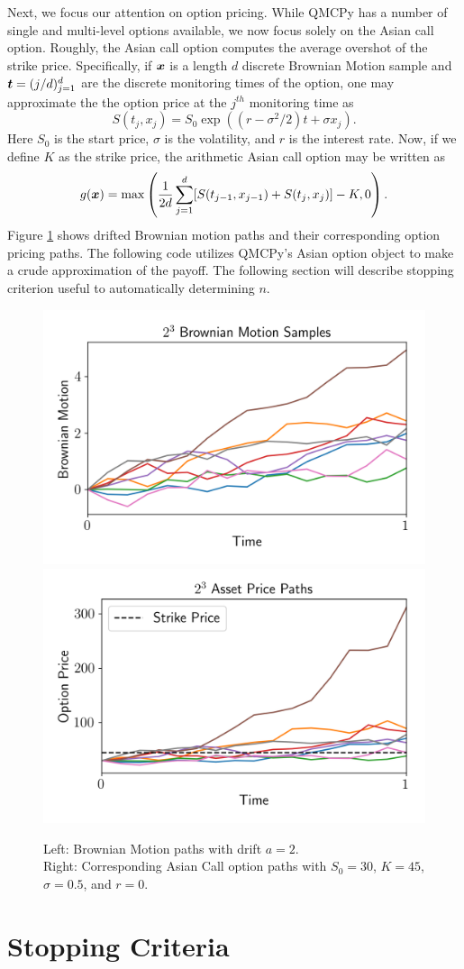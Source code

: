 \documentclass[graybox,footinfo]{svmult}
\begin{document}
Next, we focus our attention on option pricing. While QMCPy has a number of single and multi-level options available, we now focus solely on the Asian call option. Roughly, the  Asian call option computes the average overshot of the strike price. Specifically, if ${\boldsymbol{x}}$ is a length $d$ discrete Brownian Motion sample and ${\boldsymbol{t}} = (j/d)_{j=1}^d$ are the discrete monitoring times of the option, one may approximate the the option price at the $j^{th}$ monitoring time as 
$$S(t_j,x_j) = S_0 \exp((r-\sigma^2/2)t+\sigma x_j).$$
Here $S_0$ is the start price, $\sigma$ is the volatility, and $r$ is the interest rate. Now, if we define $K$ as the strike price, the arithmetic Asian call option may be written as 
$$g({\boldsymbol{x}}) = \max\left(\frac{1}{2d}\sum_{j=1}^d [S(t_{j-1},x_{j-1})+S(t_j,x_j)]-K,0\right).$$
Figure \ref{fig:aco} shows drifted Brownian motion paths and their corresponding option pricing paths. The following code utilizes QMCPy's Asian option object to make a crude approximation of the payoff. The following section will describe stopping criterion useful to automatically determining $n$. 

\begin{figure}
	\includegraphics[width=.45\textwidth]{ags/figs/i.bm.png} 
	\includegraphics[width=.45\textwidth]{ags/figs/i.aco.png}
	\caption{Left: Brownian Motion paths with drift $a=2$.\\ Right: Corresponding Asian Call option paths with $S_0=30$, $K=45$, $\sigma=0.5$, and $r=0$.}
	\label{fig:aco}
\end{figure}

\section{Stopping Criteria}
\end{document}
